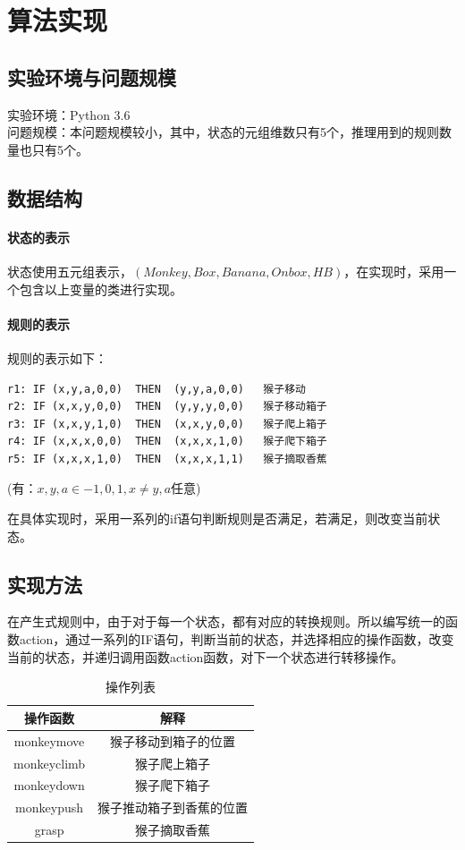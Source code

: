 \section{算法实现}

\subsection{实验环境与问题规模}
实验环境：Python 3.6 \\
问题规模：本问题规模较小，其中，状态的元组维数只有5个，推理用到的规则数量也只有5个。


\subsection{数据结构}
\paragraph{状态的表示} 状态使用五元组表示，$(Monkey, Box, Banana, Onbox, HB)$，在实现时，采用一个包含以上变量的类进行实现。
\paragraph{规则的表示} 规则的表示如下：
\begin{lstlisting}
r1: IF (x,y,a,0,0)  THEN  (y,y,a,0,0)	猴子移动
r2: IF (x,x,y,0,0)  THEN  (y,y,y,0,0)	猴子移动箱子
r3: IF (x,x,y,1,0)  THEN  (x,x,y,0,0)	猴子爬上箱子
r4: IF (x,x,x,0,0)  THEN  (x,x,x,1,0)	猴子爬下箱子
r5: IF (x,x,x,1,0)  THEN  (x,x,x,1,1)	猴子摘取香蕉
\end{lstlisting}
(有：$x,y,a \in {-1,0,1},x \neq y,a$任意)
\par 在具体实现时，采用一系列的if语句判断规则是否满足，若满足，则改变当前状态。
\subsection{实现方法}
\par 在产生式规则中，由于对于每一个状态，都有对应的转换规则。所以编写统一的函数action，通过一系列的IF语句，判断当前的状态，并选择相应的操作函数，改变当前的状态，并递归调用函数action函数，对下一个状态进行转移操作。
\begin{table}[H]
  \centering
  \caption{操作列表}
    \begin{tabular}{cc}
    \toprule
    操作函数  & 解释 \\
    \midrule
    monkeymove & 猴子移动到箱子的位置 \\
    monkeyclimb & 猴子爬上箱子 \\
    monkeydown & 猴子爬下箱子 \\
    monkeypush & 猴子推动箱子到香蕉的位置 \\
    grasp & 猴子摘取香蕉 \\
    \bottomrule
    \end{tabular}%
  \label{tab:addlabel}%
\end{table}%

